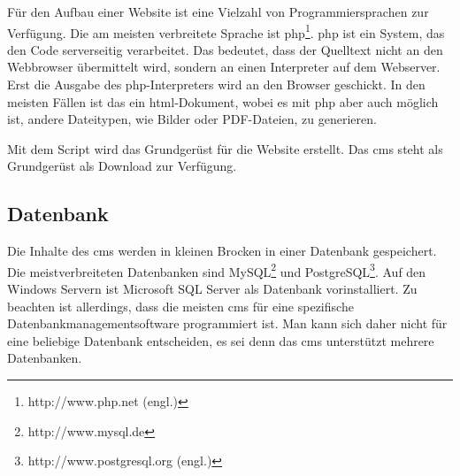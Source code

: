 \documentclass[a4paper,11pt,twoside,titlepage,openright]{report}
\numberwithin{equation}{section}		%
\numberwithin{figure}{section}			%
\numberwithin{table}{section}				%
\begin{document}
Für den Aufbau einer Website ist eine Vielzahl von Programmiersprachen zur Verfügung. Die am meisten verbreitete Sprache ist \acrshort{php}\footnote{http://www.php.net (engl.)}. \acrshort{php} ist ein System, das den Code serverseitig verarbeitet. Das bedeutet, dass der Quelltext nicht an den Webbrowser übermittelt wird, sondern an einen Interpreter auf dem Webserver. Erst die Ausgabe des \acrshort{php}-Interpreters wird an den Browser geschickt. In den meisten Fällen ist das ein \acrshort{html}-Dokument, wobei es mit \acrshort{php} aber auch möglich ist, andere Dateitypen, wie Bilder oder PDF-Dateien, zu generieren.

Mit dem Script wird das Grundgerüst für die Website erstellt. Das \acrshort{cms} steht als Grundgerüst als Download zur Verfügung.

\subsection{Datenbank}

Die Inhalte des \acrshort{cms} werden in kleinen Brocken in einer Datenbank gespeichert. Die meistverbreiteten Datenbanken sind MySQL\footnote{http://www.mysql.de} und PostgreSQL\footnote{http://www.postgresql.org (engl.)}. Auf den Windows Servern ist Microsoft SQL Server als Datenbank vorinstalliert. Zu beachten ist allerdings, dass die meisten \acrshort{cms} für eine spezifische Datenbankmanagementsoftware programmiert ist. Man kann sich daher nicht für eine beliebige Datenbank entscheiden, es sei denn das \acrshort{cms} unterstützt mehrere Datenbanken.
\end{document}
